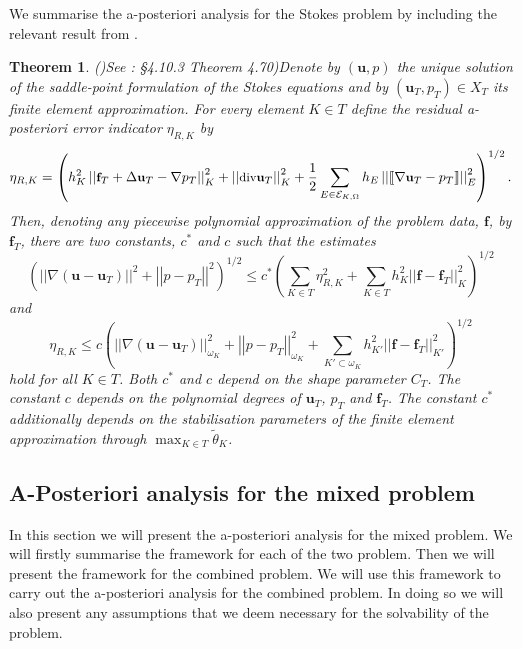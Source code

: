 \documentclass[12pt,a4paper]{article}
\newtheorem{theorem}{Theorem}[section]
\theoremstyle{definition}
\begin{document}
We summarise the a-posteriori analysis for the Stokes problem by including the relevant result from \cite{verfurth2013posteriori}.
\begin{theorem}{()See \cite{verfurth2013posteriori}: \S4.10.3 Theorem 4.70)}\label{verf_theorem_apost_err_ind}
Denote by $\left(\textbf{u},p\right)$ the unique solution of the saddle-point formulation of the Stokes equations and by $\left(\textbf{u}_T,p_T\right)\in X_T$ its finite element approximation.  For every element $K\in T$ define the residual a-posteriori error indicator $\eta_{R,K}$ by
\begin{equation}\small
\eta_{R,K}=\left(h^2_K\left|\left|\textbf{f}_T+\Delta \textbf{u}_T-\nabla p_T\right|\right|^2_K+\left|\left|\text{div} \textbf{u}_T\right|\right|^2_K+\frac{1}{2}\sum_{E\in\mathcal{E}_{K,\Omega}}h_E\left|\left| \llbracket \nabla \textbf{u}_T -p_T \rrbracket \right|\right|_E^2\right)^{1/2}.\nonumber
\end{equation}
Then, denoting any piecewise polynomial approximation of the problem data, $\textbf{f}$, by $\textbf{f}_T$, there are two constants, $c^*$ and $c$ such that the estimates
\begin{equation}\nonumber
\left(\left|\left|\nabla\left(\textbf{u}-\textbf{u}_T\right)\right|\right|^2+\left|\left|p-p_T\right|\right|^2\right)^{1/2}\leq c^*\left(\sum_{K\in T}\eta^2_{R,K}+\sum_{K\in T}h^2_K\left|\left|\textbf{f}-\textbf{f}_T\right|\right|^2_K\right)^{1/2}
\end{equation}
and
\begin{equation}\nonumber
\eta_{R,K}\leq c \left(\left|\left|\nabla\left(\textbf{u}-\textbf{u}_T\right)\right|\right|_{\omega_K}^2+\left|\left|p-p_T\right|\right|_{\omega_K}^2+\sum_{K'\subset \omega_K}h^2_{K'}\left|\left|\textbf{f}-\textbf{f}_T\right|\right|^2_{K'}\right)^{1/2}
\end{equation}
hold for all $K\in T$.  Both $c^*$ and $c$ depend on the shape parameter $C_T$.  The constant $c$ depends on the polynomial degrees of $\textbf{u}_T$, $p_T$ and $\textbf{f}_T$.  The constant $c^*$ additionally depends on the stabilisation parameters of the finite element approximation through $\max_{K\in T}\widetilde{\theta}_K$.
\end{theorem}


\subsection{A-Posteriori analysis for the mixed problem}
In this section we will present the a-posteriori analysis for the mixed problem.  We will firstly summarise the framework for each of the two problem.  Then we will present the framework for the combined problem.   We will use this framework to carry out the a-posteriori analysis for the combined problem.  In doing so we will also present any assumptions that we deem necessary for the solvability of the problem.
\end{document}
